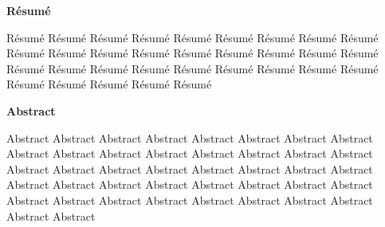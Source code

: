 \documentclass[sommairechap,stylejchiquet]{these_gi}
\begin{document}
\begin{center}
\textbf{Résumé} 
\end{center}

Résumé  Résumé  Résumé  Résumé  Résumé  Résumé  Résumé  Résumé  Résumé  Résumé  Résumé  Résumé  Résumé  Résumé  Résumé  Résumé  Résumé  Résumé  Résumé  Résumé  Résumé  Résumé  Résumé  Résumé  Résumé  Résumé  Résumé  Résumé  Résumé  Résumé  Résumé  Résumé  

\begin{otherlanguage}{english}

\begin{center}
\textbf{Abstract}
\end{center}

Abstract Abstract Abstract Abstract Abstract Abstract Abstract Abstract Abstract Abstract Abstract Abstract Abstract Abstract Abstract Abstract Abstract Abstract Abstract Abstract Abstract Abstract Abstract Abstract Abstract Abstract Abstract Abstract Abstract Abstract Abstract Abstract Abstract Abstract Abstract Abstract Abstract Abstract Abstract Abstract Abstract Abstract 
\end{otherlanguage}



 
 
 
 
 
 
\end{document}
